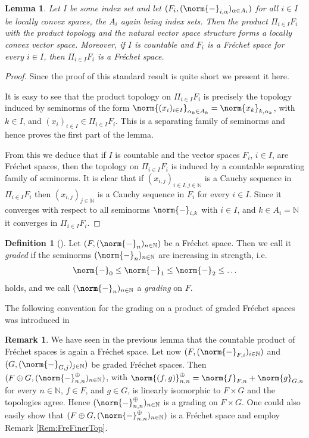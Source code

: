 \documentclass[12pt,a4paper]{article}
\theoremstyle{plain}
\newtheorem{lemma}[theorem]{Lemma}
\theoremstyle{definition}
\newtheorem{definition}[theorem]{Definition}
\newtheorem{remark}[theorem]{Remark}
\newcommand{\N}{\mathbb{N}}
\newcommand{\nnorm}[2]{\norm{#1}_{#2}}
\begin{document}
\begin{lemma}
\label{Lemma:ProductOfLCAndFreSpaces}
Let $I$ be some index set and let $(F_i,(\nnorm{-}{i,\alpha})_{\alpha \in A_i})$ for all $i\in I$ be locally convex spaces, the $A_i$ again being index sets. Then the product $\Pi_{i\in I}F_i$ with the product topology and the natural vector space structure forms a locally convex vector space. Moreover, if $I$ is countable and $F_i$ is a Fréchet space for every $i\in I$,  then $\Pi_{i\in I}F_i$ is a Fréchet space.
\end{lemma}
\begin{proof}
Since the proof of this standard result is quite short we present it here.

It is easy to see that the product topology on $\Pi_{i\in I}F_i$ is precisely the topology induced by seminorms of the form $\nnorm{(x_i)_{i\in I}}{\alpha_{k}\in A_{k}}=\nnorm{x_{k}}{k,\alpha_{k}}$, with $k\in I$, and $(x_i)_{i\in I}\in \Pi_{i\in I}F_i$. This is a separating family of seminorms and hence proves the first part of the lemma.

From this we deduce that if $I$ is countable and the vector spaces $F_i$, $i\in I$, are Fréchet spaces, then the topology on $\Pi_{i\in I}F_i$ is induced by a countable separating family of seminorms. It is clear that if $(x_{i,j})_{i\in I, j\in \N}$ is a Cauchy sequence in $\Pi_{i\in I}F_i$ then $(x_{i,j})_{j\in \N}$ is a Cauchy sequence in $F_i$ for every $i\in I$. Since it converges with respect to all seminorms $\nnorm{-}{i,k}$ with $i\in I$, and $k\in A_i=\N$ it converges in $\Pi_{i\in I}F_i$.
\end{proof}


\begin{definition}[{\cite[Part II, Definition 1.1.1]{hamilton}}]
\label{Def:GradFreSpac}
Let $(F,(\nnorm{-}{n})_{n\in \N})$ be a Fréchet space. Then we call it \textit{graded} if the seminorms $(\nnorm{-}{n})_{n\in \N}$ are increasing in strength, i.e.
\begin{align*}
    \nnorm{-}{0}\leq \nnorm{-}{1}\leq \nnorm{-}{2}\leq \ldots
\end{align*}
holds, and we call $(\nnorm{-}{n})_{n\in \N}$ a \textit{grading} on $F$.
\end{definition}


The following convention for the grading on a product of graded Fréchet spaces was introduced in \cite[p.~134]{hamilton}
\begin{remark}
\label{Rem:ProdOfFreSpa}
We have seen in the previous lemma that the countable product of Fréchet spaces is again a Fréchet space. Let now $(F,(\nnorm{-}{F,i})_{i\in \N})$ and $(G,(\nnorm{-}{G,j})_{j\in \N})$ be graded Fréchet spaces. Then $(F\oplus G, (\nnorm{-}{n,n}^\oplus)_{n\in \N})$, with $\nnorm{(f,g)}{n,n}^\oplus=\nnorm{f}{F,n}+\nnorm{g}{G,n}$ for every $n\in \N$, $f\in F$, and $g\in G$, is linearly isomorphic to $F\times G$ and the topologies agree. Hence $(\nnorm{-}{n,n}^\oplus)_{n\in \N}$ is a grading on $F\times G$.
One could also easily show that $(F\oplus G, (\nnorm{-}{n,n}^\oplus)_{n\in \N})$ is a Fréchet space and employ Remark \ref{Rem:FreFinerTop}.
\end{remark}
\end{document}
